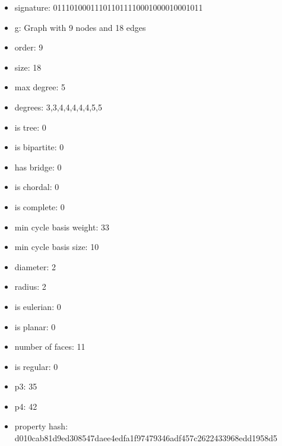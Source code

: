 \newpage
\begin{figure}
\end{figure}
\begin{itemize}
\item signature: 011101000111011011110001000010001011
\item g: Graph with 9 nodes and 18 edges
\item order: 9
\item size: 18
\item max degree: 5
\item degrees: 3,3,4,4,4,4,4,5,5
\item is tree: 0
\item is bipartite: 0
\item has bridge: 0
\item is chordal: 0
\item is complete: 0
\item min cycle basis weight: 33
\item min cycle basis size: 10
\item diameter: 2
\item radius: 2
\item is eulerian: 0
\item is planar: 0
\item number of faces: 11
\item is regular: 0
\item p3: 35
\item p4: 42
\item property hash: d010cab81d9ed308547daee4edfa1f97479346adf457c2622433968edd1958d5
\end{itemize}
